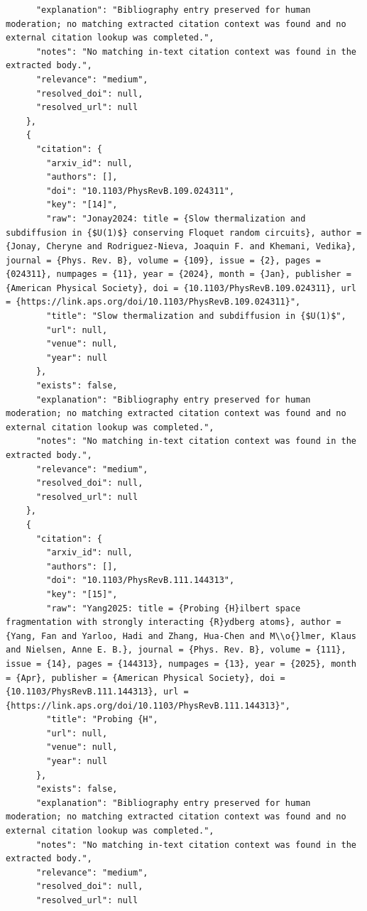\documentclass[11pt]{article}
\begin{document}
\begin{verbatim}
      "explanation": "Bibliography entry preserved for human moderation; no matching extracted citation context was found and no external citation lookup was completed.",
      "notes": "No matching in-text citation context was found in the extracted body.",
      "relevance": "medium",
      "resolved_doi": null,
      "resolved_url": null
    },
    {
      "citation": {
        "arxiv_id": null,
        "authors": [],
        "doi": "10.1103/PhysRevB.109.024311",
        "key": "[14]",
        "raw": "Jonay2024: title = {Slow thermalization and subdiffusion in {$U(1)$} conserving Floquet random circuits}, author = {Jonay, Cheryne and Rodriguez-Nieva, Joaquin F. and Khemani, Vedika}, journal = {Phys. Rev. B}, volume = {109}, issue = {2}, pages = {024311}, numpages = {11}, year = {2024}, month = {Jan}, publisher = {American Physical Society}, doi = {10.1103/PhysRevB.109.024311}, url = {https://link.aps.org/doi/10.1103/PhysRevB.109.024311}",
        "title": "Slow thermalization and subdiffusion in {$U(1)$",
        "url": null,
        "venue": null,
        "year": null
      },
      "exists": false,
      "explanation": "Bibliography entry preserved for human moderation; no matching extracted citation context was found and no external citation lookup was completed.",
      "notes": "No matching in-text citation context was found in the extracted body.",
      "relevance": "medium",
      "resolved_doi": null,
      "resolved_url": null
    },
    {
      "citation": {
        "arxiv_id": null,
        "authors": [],
        "doi": "10.1103/PhysRevB.111.144313",
        "key": "[15]",
        "raw": "Yang2025: title = {Probing {H}ilbert space fragmentation with strongly interacting {R}ydberg atoms}, author = {Yang, Fan and Yarloo, Hadi and Zhang, Hua-Chen and M\\o{}lmer, Klaus and Nielsen, Anne E. B.}, journal = {Phys. Rev. B}, volume = {111}, issue = {14}, pages = {144313}, numpages = {13}, year = {2025}, month = {Apr}, publisher = {American Physical Society}, doi = {10.1103/PhysRevB.111.144313}, url = {https://link.aps.org/doi/10.1103/PhysRevB.111.144313}",
        "title": "Probing {H",
        "url": null,
        "venue": null,
        "year": null
      },
      "exists": false,
      "explanation": "Bibliography entry preserved for human moderation; no matching extracted citation context was found and no external citation lookup was completed.",
      "notes": "No matching in-text citation context was found in the extracted body.",
      "relevance": "medium",
      "resolved_doi": null,
      "resolved_url": null

\end{verbatim}
\end{document}
